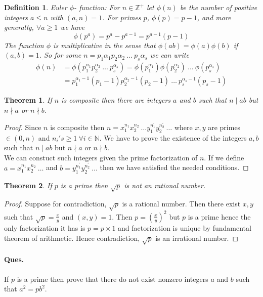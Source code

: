 \documentclass[12pt]{report}
\newtheorem{thm}{Theorem}
\newtheorem{defn}{Definition}
\begin{document}
\begin{defn}
    Euler $\phi$- function: For $n \in \mathbb{Z^+}$ let $\phi(n)$ be the number of positive integers $a \leq n$ with $(a,n) = 1$. For primes $p$, $\phi(p) = p-1$, and more generally, $\forall a \geq 1$ we have
    $$ \phi(p^a) = p^a - p^{a-1} = p^{a-1}(p-1)$$
    The function $\phi$ is {\em multiplicative} in the sense that $ \phi(ab) = \phi(a)\phi(b)$  if $(a,b) = 1$. So for some $n = p_1{\alpha_1}p_2{\alpha_2}~\dots ~p_s{\alpha_s}$ we can write
    \begin{align*}
        \phi(n) &= \phi(p_1^{\alpha_1}p_2^{\alpha_2}~\dots ~p_s^{\alpha_s}) = \phi(p_1^{\alpha_1})\phi(p_2^{\alpha_2}) ~\dots~ \phi(p_s^{\alpha_s})\\
        &= p_1^{\alpha_1-1}(p_1-1)p_2^{\alpha_2-1}(p_2-1) ~\dots~ p_s^{\alpha_s-1}(p_s-1)
    \end{align*}
\end{defn}
\begin{thm}
    If $n$ is composite then there are integers $a$ and $b$ such that $n\mid ab$ but $n \nmid a$ or $n \nmid b$.
\end{thm}
\begin{proof}
    Since $n$ is composite then $n = x_1^{n_1} x_2^{n_2}~\dots y_1^{n_1^{'}}y_2^{n_2^{'}}~\dots $ where $ x,y$ are primes $\in (0,n)$ and $n_i's \geq 1~\forall i \in \mathbb{N}$. We have to prove the existence of the integers $a,b$ such that $n \mid ab$ but $n \nmid a$ or $n \nmid b$. \\
    We can constuct such integers given the prime factorization of $n$. If we define $a = x_1^{n_1} x_2^{n_2}~\dots $ and $ b = y_1^{n_1^{'}}y_2^{n_2^{'}}~\dots$ then we have satisfied the needed conditions.
\end{proof}
\begin{thm}
    If $p$ is a prime then $\sqrt{p}$ is not an rational number.
\end{thm}
\begin{proof}
    Suppose for contradiction, $\sqrt{p}$ is a rational number. Then there exist $x, y$ such that $\sqrt{p} = \frac{x}{y}$ and $(x, y) = 1$. Then $p = (\frac{x}{y})^2$ but $p$ is a prime hence the only factorization it has is $ p = p \times 1$ and factorization is unique by fundamental theorem of arithmetic. Hence contradiction, $\sqrt{p}$ is an irrational number. 
\end{proof}
\paragraph*{Ques.}If $p$ is a prime then prove that there do not exist nonzero integers $a$ and $b$ such that $a^2 = pb^2$.
\end{document}
